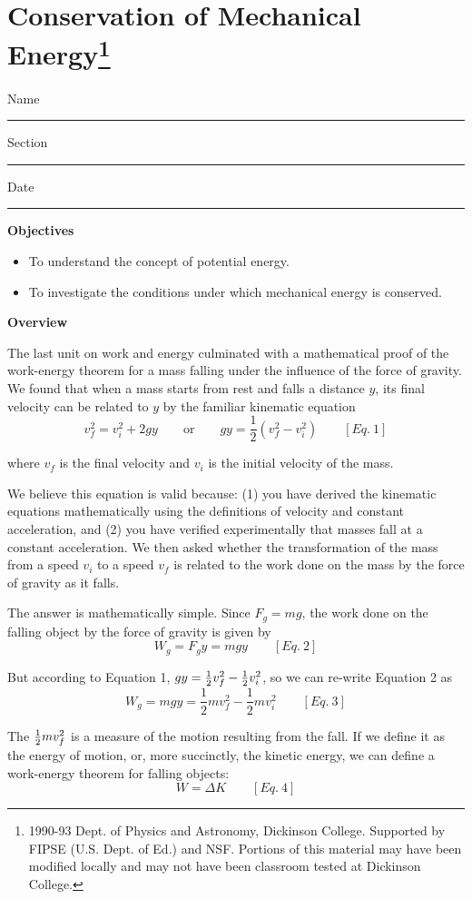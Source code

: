 \section{Conservation of Mechanical Energy\footnote{
1990-93 Dept. of Physics and Astronomy, Dickinson College. Supported by FIPSE
(U.S. Dept. of Ed.) and NSF. Portions of this material may have been modified
locally and may not have been classroom tested at Dickinson College.
}}

Name \rule{2.0in}{0.1pt}\hfill{}Section \rule{1.0in}{0.1pt}\hfill{}Date \rule{1.0in}{0.1pt}

\textbf{Objectives }

\begin{itemize}
\item To understand the concept of potential energy. 
\item To investigate the conditions under which mechanical energy is conserved.
\end{itemize}
\textbf{Overview }

The last unit on work and energy culminated with a mathematical proof of the
work-energy theorem for a mass falling under the influence of the force of gravity.
We found that when a mass starts from rest and falls a distance $y$, its final
velocity can be related to $y$ by the familiar kinematic equation
\[
v_{f}^{2}=v_{i}^{2}+2gy\qquad \mbox{or}
\qquad gy=\frac{1}{2}\left( v_{f}^{2}-v_{i}^{2}\right) \qquad [Eq.\: 1]\]


where \( v_{f} \) is the final velocity and \( v_{i} \) is the initial velocity
of the mass.

We believe this equation is valid because: (1) you have derived the kinematic
equations mathematically using the definitions of velocity and constant acceleration,
and (2) you have verified experimentally that masses fall at a constant acceleration.
We then asked whether the transformation of the mass from a speed \( v_{i} \)
to a speed \( v_{f} \) is related to the work done on the mass by the force
of gravity as it falls.

The answer is mathematically simple. Since \( F_{g}=mg \), the work done
on the falling object by the force of gravity is given by
\[
W_{g}=F_{g}y=mgy\qquad [Eq.\: 2]\]


But according to Equation 1, \(gy = {1\over 2} v_{f}^{2} - {1\over 2} 
v_{i}^{2} \),
so we can re-write Equation 2 as
\[
W_{g}=mgy=\frac{1}{2}mv_{f}^{2}-\frac{1}{2}mv_{i}^{2}\qquad [Eq.\: 3]\]


The \({1\over 2}mv_{f}^{2} \) is a measure of the motion resulting from the fall.
If we define it as the energy of motion, or, more succinctly, the kinetic energy,
we can define a work-energy theorem for falling objects:
\[
W=\Delta K\qquad [Eq.\: 4]\]


